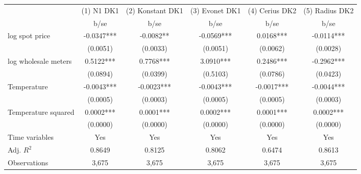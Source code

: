 \begin{tabular}{lccccc}\toprule
                    &(1) N1 DK1   &(2) Konstant DK1   &(3) Evonet DK1   &(4) Cerius DK2   &(5) Radius DK2   \\
                    &        b/se   &        b/se   &        b/se   &        b/se   &        b/se   \\
\midrule
log spot price      &     -0.0347***&     -0.0082** &     -0.0569***&      0.0168***&     -0.0114***\\
                    &    (0.0051)   &    (0.0033)   &    (0.0051)   &    (0.0062)   &    (0.0028)   \\
log wholesale meters&      0.5122***&      0.7768***&      3.0910***&      0.2486***&     -0.2962***\\
                    &    (0.0894)   &    (0.0399)   &    (0.5103)   &    (0.0786)   &    (0.0423)   \\
Temperature         &     -0.0043***&     -0.0023***&     -0.0043***&     -0.0017***&     -0.0044***\\
                    &    (0.0005)   &    (0.0003)   &    (0.0005)   &    (0.0005)   &    (0.0003)   \\
Temperature squared &      0.0002***&      0.0001***&      0.0002***&      0.0001***&      0.0002***\\
                    &    (0.0000)   &    (0.0000)   &    (0.0000)   &    (0.0000)   &    (0.0000)   \\
Time variables      &         Yes   &         Yes   &         Yes   &         Yes   &         Yes   \\
\midrule
Adj. \(R^2\)        &      0.8649   &      0.8125   &      0.8062   &      0.6474   &      0.8613   \\
Observations        &       3,675   &       3,675   &       3,675   &       3,675   &       3,675   \\
\bottomrule\end{tabular}
